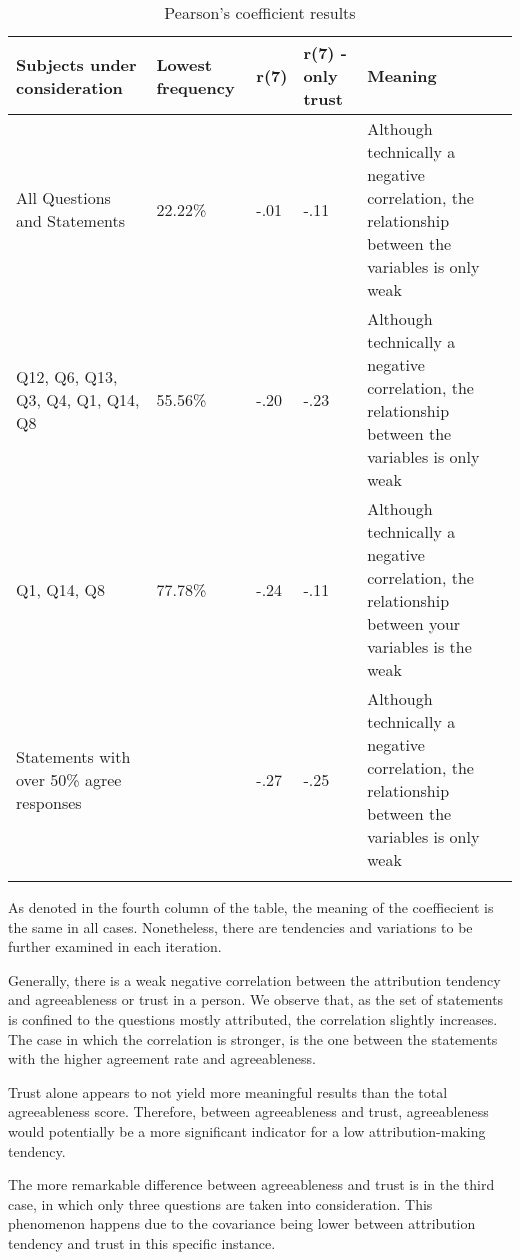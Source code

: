 \begin{longtable}{  p{}  p{}  p{}   p{}  p{} }
\caption[Pearson's coefficient results]{Pearson's coefficient results} \\
  \hline
  \hline
    Subjects under consideration & Lowest frequency  & r(7)  & r(7) - only trust & Meaning \\
    \hline
    \hline
    All Questions and Statements & 22.22\% &  -.01 & -.11 & Although technically a negative correlation, the relationship between the variables is only weak   \\
    Q12, Q6, Q13, Q3, Q4, Q1, Q14, Q8 & 55.56\% & -.20 & -.23 & Although technically a negative correlation, the relationship between the variables is only weak  \\
    Q1, Q14, Q8 & 77.78\% & -.24 &  -.11 & Although technically a negative correlation, the relationship between your variables is the weak \\
    Statements with over 50\% agree responses &  & -.27 & -.25 & Although technically a negative correlation, the relationship between the variables is only weak \\
    \bottomrule
    \label{tab:PearsonResults}  
\end{longtable}

As denoted in the fourth column of the table, the meaning of the coeffiecient is the same in all cases. Nonetheless, there are tendencies and variations to be further examined in each iteration. 

Generally, there is a weak negative correlation between the attribution tendency and agreeableness or trust in a person. We observe that, as the set of statements is confined to the questions mostly attributed, the correlation slightly increases. The case in which the correlation is stronger, is the one between the statements with the higher agreement rate and agreeableness. 

Trust alone appears to not yield more meaningful results than the total agreeableness score. Therefore, between agreeableness and trust, agreeableness would potentially be a more significant indicator for a low attribution-making tendency.

The more remarkable difference between agreeableness and trust is in the third case, in which only three questions are taken into consideration. This phenomenon happens due to the covariance being lower between attribution tendency and trust in this specific instance.

